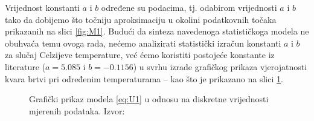 \documentclass[a4paper,12pt,oneside]{memoir}
\newcommand{\pgfmathparseFPU}[1]{\begingroup%
\pgfkeys{/pgf/fpu,/pgf/fpu/output format=fixed}%
\pgfmathparse{#1}%
\pgfmathsmuggle\pgfmathresult\endgroup}
\begin{document}
            Vrijednost konstanti $a$ i $b$ određene su podacima, tj. odabirom vrijednosti $a$ i $b$ tako da dobijemo što točniju aproksimaciju u okolini podatkovnih točaka prikazanih na slici \ref{fig:M1}. Budući da sinteza navedenoga statističkoga modela ne obuhvaća temu ovoga rada, nećemo analizirati statistički izračun konstanti $a$ i $b$ za slučaj Celzijeve temperature, već ćemo koristiti postojeće konstante iz literature ($a=5.085$ i $b=-0.1156$)\cite{Dekking} u svrhu izrade grafičkog prikaza vjerojatnosti kvara brtvi pri određenim temperaturama -- kao što je prikazano na slici \ref{fig:M2}.
            
            \begin{figure}[H]
                \centering
                \caption{Grafički prikaz modela \eqref{eq:U1} u odnosu na diskretne vrijednosti mjerenih podataka. Izvor: \cite{Dekking}}
                \label{fig:M2}
            \end{figure}
\end{document}
